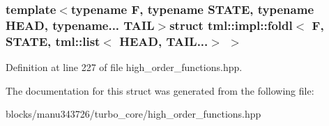 \subsubsection*{template$<$typename F, typename S\+T\+A\+T\+E, typename H\+E\+A\+D, typename... T\+A\+I\+L$>$struct tml\+::impl\+::foldl$<$ F, S\+T\+A\+T\+E, tml\+::list$<$ H\+E\+A\+D, T\+A\+I\+L...$>$ $>$}



Definition at line 227 of file high\+\_\+order\+\_\+functions.\+hpp.



The documentation for this struct was generated from the following file\+:\begin{DoxyCompactItemize}
\item 
blocks/manu343726/turbo\+\_\+core/high\+\_\+order\+\_\+functions.\+hpp\end{DoxyCompactItemize}
